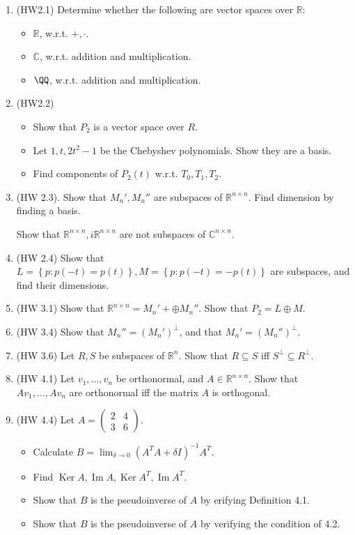 \documentclass{article}
\newcommand{\mat}[1]{\begin{pmatrix}#1\end{pmatrix}}
\newcommand{\RR}{\mathbb{R}}
\newcommand{\CC}{\mathbb{C}}
\DeclareMathOperator{\Ker}{Ker}
\DeclareMathOperator{\Ima}{Im}
\DeclareMathOperator{\Ima}{Im}
\begin{document}
\begin{enumerate}
  \item (HW2.1) Determine whether the following are vector spaces over $\RR$:

    \begin{itemize}
      \item $\RR$, w.r.t. $+, \cdot$.
      \item $\CC$, w.r.t. addition and multiplication.
      \item $\QQ$, w.r.t. addition and multiplication.
    \end{itemize}
  \item (HW2.2)
    \begin{itemize}
      \item Show that $P_2$ is a vector space over $R$.
      \item Let $1, t, 2t^2-1$ be the Chebyshev polynomials. Show they are a basis.
      \item Find components of $P_2(t)$ w.r.t. $T_0, T_1, T_2$.
    \end{itemize}


  \item  (HW 2.3). Show that $M_n', M_n''$ are subspaces of $\RR^{n \times n}$.  Find dimension by finding a basis.

    Show that $\RR^{n \times n}, i \RR^{n \times n}$ are not subspaces of $\CC^{n \times n}$.

  \item (HW 2.4) Show that $L = \left\{ p: p(-t) = p(t) \right\}, M = \left\{ p: p(-t) = - p(t) \right\}$ are subspaces, and find their dimensions.

  \item (HW 3.1) Show that $\RR^{n \times n} = M_n' + \oplus M_n''$.  Show that $P_2 = L \oplus M$.

  \item (HW 3.4) Show that $M_n'' = (M_n')^{\perp}$, and that $M_n' = (M_n'')^{\perp}$.

  \item (HW 3.6) Let $R, S$ be subspaces of $\RR^n$.  Show that $R \subseteq S$ iff $S^{\perp} \subseteq R^{\perp}$.

  \item (HW 4.1) Let $v_1, \dots, v_n$ be orthonormal, and $A \in \RR^{n \times n}$.  Show that $Av_1, \dots, A v_n$ are orthonormal iff the matrix $A$ is orthogonal.

  \item (HW 4.4) Let $A = \mat{2 & 4 \\ 3 & 6}$.  

    \begin{itemize}
      \item Calculate $B = \lim_{\delta \to 0} (A^T A + \delta I)^{-1} A^T$.
      \item Find $\Ker A, \Ima A, \Ker A^T, \Ima A^T$.
      \item Show that $B$ is the pseudoinverse of $A$ by erifying Definition 4.1.
      \item Show that $B$ is the pseudoinverse of $A$ by verifying the condition of 4.2.
    \end{itemize} 
\end{enumerate}
\end{document}
